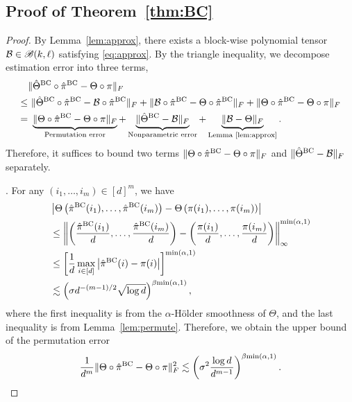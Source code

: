 \documentclass[12pt]{article}
\theoremstyle{definition}
\def\caliB{\mathscr{B}}
\begin{document}
\subsection{Proof of Theorem~\ref{thm:BC}}
\begin{proof}
By Lemma~\ref{lem:approx}, there exists a block-wise polynomial tensor $\tB\in\caliB(k,\ell)$ satisfying \eqref{eq:approx}.
By the triangle inequality,
we decompose estimation error into three terms,
\begin{align}\label{eq:3decomp}
    &\FnormSize{}{\hat\Theta^{\text{BC}}\circ \hat\pi^{\text{BC}}-\Theta\circ\pi}\\
    \leq&\ \FnormSize{}{\hat\Theta^{\text{BC}}\circ \hat\pi^{\text{BC}}-\tB\circ\hat\pi^{\text{BC}}}+\FnormSize{}{\tB\circ\hat\pi^{\text{BC}}-\Theta\circ\hat\pi^{\text{BC}}}+\FnormSize{}{\Theta\circ\hat\pi^{\text{BC}}-\Theta\circ\pi}\nonumber\\
    =&\ \underbrace{\FnormSize{}{\Theta\circ\hat\pi^{\text{BC}}-\Theta\circ\pi}}_{\textup{Permutation error}}+\underbrace{\FnormSize{}{\hat\Theta^{\text{BC}}-\tB}}_{\textup{Nonparametric error}}+\underbrace{\FnormSize{}{\tB-\Theta}}_{\textup{Lemma~\ref{lem:approx}}}.
\end{align}
Therefore, it suffices to bound two terms $\lVert\Theta\circ\hat\pi^{\text{BC}}-\Theta\circ\pi\rVert_F$ and $\lVert\hat\Theta^{\text{BC}}-\mathcal{B}\rVert_F$ separately. 

.
    For any $(i_1,\ldots,i_m)\in[d]^m$, we have 
    \begin{align}
        &\left|\Theta\left(\hat\pi^{\textup{BC}}(i_1),\ldots,\hat\pi^{\textup{BC}}(i_m)\right)-\Theta\left(\pi(i_1),\ldots,\pi(i_m)\right)\right|\\&\leq \left\|\left(\frac{\hat\pi^{\textup{BC}}(i_1)}{d},\ldots,\frac{\hat\pi^{\textup{BC}}(i_m)}{d}\right)-\left(\frac{\pi(i_1)}{d},\ldots,\frac{\pi(i_m)}{d}\right)\right\|_\infty^{\min(\alpha,1)}\\&\leq \left[\frac{1}{d}\max_{i\in[d]}\left|\hat\pi^{\textup{BC}}(i)-\pi(i)\right|\right]^{\min(\alpha,1)}\\&\lesssim \left(\sigma d^{-(m-1)/2}\sqrt{\log d}\right)^{\beta{\min(\alpha,1)}},
    \end{align}
    where the first inequality is from the $\alpha$-H\"older smoothness of $\Theta$, and the last inequality is from Lemma~\ref{lem:permute}. Therefore, we obtain the upper bound of the permutation error 
    \begin{align}\label{eq:permerror}
        \frac{1}{d^m}\lVert\Theta\circ\hat\pi^{\text{BC}}-\Theta\circ\pi\rVert_F^2\lesssim \left(\sigma^2 \frac{\log d}{d^{m-1}}\right)^{\beta{\min(\alpha,1)}}.
    \end{align}
    

\end{proof}
\end{document}
